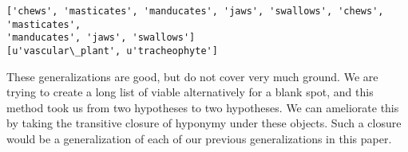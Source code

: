 \documentclass[11pt]{article}
\begin{document}
    \begin{Verbatim}[commandchars=\\\{\},fontsize=\footnotesize]
['chews', 'masticates', 'manducates', 'jaws', 'swallows', 'chews', 'masticates',
'manducates', 'jaws', 'swallows']
[u'vascular\_plant', u'tracheophyte']

    \end{Verbatim}

    These generalizations are good, but do not cover very much ground. We
are trying to create a long list of viable alternatively for a blank
spot, and this method took us from two hypotheses to two hypotheses. We
can ameliorate this by taking the transitive closure of hyponymy under
these objects. Such a closure would be a generalization of each of our
previous generalizations in this paper.
\end{document}
